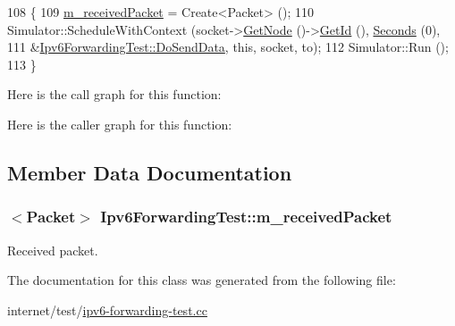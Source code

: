 \begin{DoxyCode}
108 \{
109   \hyperlink{classIpv6ForwardingTest_a0a36728f67428ce0290a1e34d2e2f3e0}{m\_receivedPacket} = Create<Packet> ();
110   Simulator::ScheduleWithContext (socket->\hyperlink{classns3_1_1Socket_aba642ad4301c1df47befc0aa9afa2e48}{GetNode} ()->\hyperlink{classns3_1_1Node_aaf49b64a843565ce3812326313b370ac}{GetId} (), 
      \hyperlink{group__timecivil_ga33c34b816f8ff6628e33d5c8e9713b9e}{Seconds} (0),
111                                   &\hyperlink{classIpv6ForwardingTest_a0e6518c7e2b24ecd83cb5857b94588ce}{Ipv6ForwardingTest::DoSendData}, \textcolor{keyword}{this}, 
      socket, to);
112   Simulator::Run ();
113 \}
\end{DoxyCode}


Here is the call graph for this function\+:




Here is the caller graph for this function\+:




\subsection{Member Data Documentation}
\subsubsection[{\texorpdfstring{m\+\_\+received\+Packet}{m_receivedPacket}}]{$<${\bf Packet}$>$ Ipv6\+Forwarding\+Test\+::m\+\_\+received\+Packet\hspace{0.3cm}{\ttfamily [private]}}\hypertarget{classIpv6ForwardingTest_a0a36728f67428ce0290a1e34d2e2f3e0}{}\label{classIpv6ForwardingTest_a0a36728f67428ce0290a1e34d2e2f3e0}


Received packet. 



The documentation for this class was generated from the following file\+:\begin{DoxyCompactItemize}
\item 
internet/test/\hyperlink{ipv6-forwarding-test_8cc}{ipv6-\/forwarding-\/test.\+cc}\end{DoxyCompactItemize}
